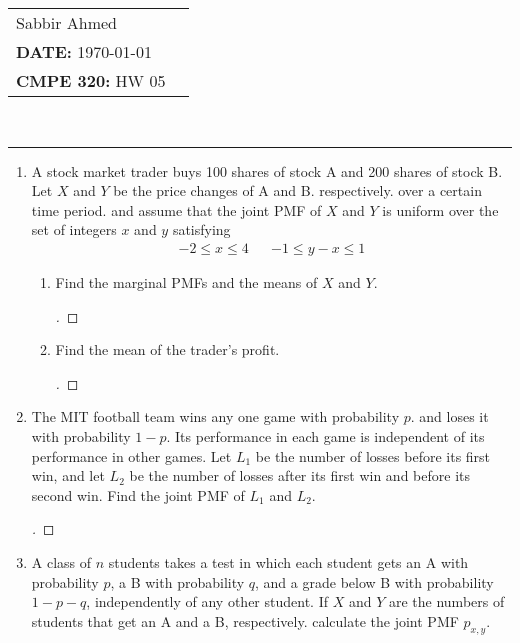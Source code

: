 \documentclass[paper=usletter, fontsize=12pt]{article}
\newcommand{\documentinfo}[5]{
    \begin{centering}
        \parbox{2in}{
        \begin{spacing}{1}
            \begin{flushleft}
                \begin{tabular}{l l}
                    #1 \\
                    #2 \\
                    #3 \\
                \end{tabular}\\
                \rule{\textwidth}{1pt}
            \end{flushleft}
        \end{spacing}
        }
    \end{centering}
}
\begin{document}
    \documentinfo{Sabbir Ahmed}{\textbf{DATE:} \today}{\textbf{CMPE 320:} HW 05}
    \vspace{-0.2in}

    \begin{enumerate}[label=\textbf{\arabic*}.]

        \item
        A stock market trader buys 100 shares of stock A and 200 shares of
        stock B. Let $X$ and $Y$ be the price changes of A and B. respectively.
        over a certain time period. and assume that the joint PMF of $X$ and
        $Y$ is uniform over the set of integers $x$ and $y$ satisfying
        \begin{align*}
            -2 \le x \le 4 && -1 \le y-x \le 1
        \end{align*}
        \begin{enumerate}[label=(\alph*)]

            \item Find the marginal PMFs and the means of $X$ and $Y$.
            \begin{proof}[\unskip\nopunct]
            \end{proof}
            \vspace{0.2in}

            \item Find the mean of the trader's profit.
            \begin{proof}[\unskip\nopunct]
            \end{proof}
            \vspace{0.2in}

        \end{enumerate}

        \item
        The MIT football team wins any one game with probability $p$. and loses
        it with probability $1 - p$. Its performance in each game is
        independent of its performance in other games. Let $L_1$ be the number
        of losses before its first win, and let $L_2$ be the number of losses
        after its first win and before its second win. Find the joint PMF of
        $L_1$ and $L_2$.
        \begin{proof}[\unskip\nopunct]
        \end{proof}
        \vspace{0.2in}

        \item
        A class of $n$ students takes a test in which each student gets an A
        with probability $p$, a B with probability $q$, and a grade below B
        with probability $1 - p - q$, independently of any other student. If
        $X$ and $Y$ are the numbers of students that get an A and a B,
        respectively. calculate the joint PMF $p_{x,y}$.


\end{enumerate}
\end{document}
